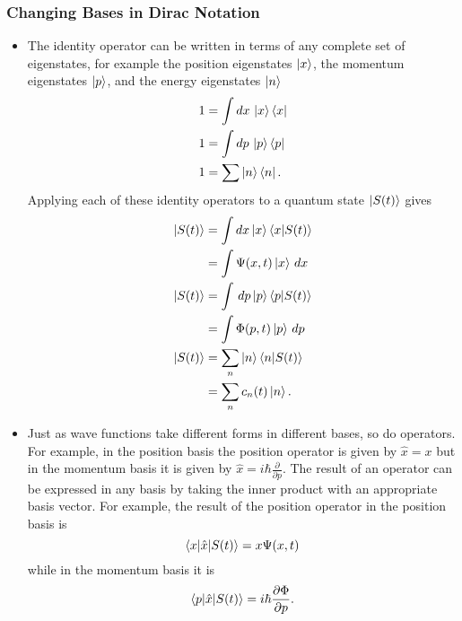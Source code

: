 \documentclass{article}
\begin{document}
\subsubsection{Changing Bases in Dirac Notation}

\begin{itemize}
  \item The identity operator can be written in terms of any complete set of eigenstates, for example the position eigenstates $\ket{x}$, the momentum eigenstates $\ket{p}$, and the energy eigenstates $\ket{n}$ \begin{align*}
          1 & = \int d x \, \ket{x} \bra{x} \\
          1 & = \int d p \, \ket{p} \bra{p} \\
          1 & = \sum \ket{n} \bra{n}.
        \end{align*} Applying each of these identity operators to a quantum state $\ket{S(t)}$ gives \begin{align*}
          \ket{S(t)} & = \int d x \ket{x} \braket{x | S(t)}   \\
                     & = \int \Psi(x, t) \ket{x} \,d x        \\
          \ket{S(t)} & = \int \,d p \ket{p} \braket{p | S(t)} \\
                     & = \int \Phi(p, t) \ket{p} \,d p        \\
          \ket{S(t)} & = \sum_n \ket{n} \braket{n | S(t)}     \\
                     & = \sum_n c_n(t) \ket{n}.
        \end{align*}

  \item Just as wave functions take different forms in different bases, so do operators. For example, in the position basis the position operator is given by $\hat{x} = x$ but in the momentum basis it is given by $\hat{x} = i \hbar \frac{\partial}{\partial p}$. The result of an operator can be expressed in any basis by taking the inner product with an appropriate basis vector. For example, the result of the position operator in the position basis is \[\braket{x | \hat{x} | S(t)} = x \Psi(x, t)\] while in the momentum basis it is \[\braket{p | \hat{x} | S(t)} = i \hbar \frac{\partial \Phi}{\partial p}.\]


\end{itemize}
\end{document}
